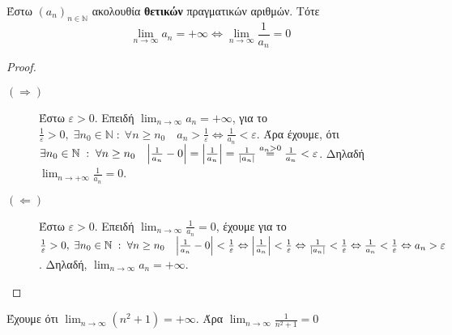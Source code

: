 \begin{mybox3}
  \begin{prop}\label{prop:infzero}
    Έστω $ (a_{n})_{n \in \mathbb{N}} $ ακολουθία \textbf{θετικών} πραγματικών αριθμών. 
    Τότε 
    \[
      \lim_{n \to \infty} a_{n}= +\infty \Leftrightarrow \lim_{n \to \infty} \frac{1}{a_{n}}
      =0  
    \] 
  \end{prop}
\end{mybox3}
\begin{proof}
\item {}
  \begin{description}
    \item[$ (\Rightarrow) $] 
      Έστω $ \varepsilon >0 $.
      Επειδή $ \lim_{n \to \infty} a_{n}= +\infty $, για το 
      $ \frac{1}{\varepsilon} >0, \; \exists n_{0} \in \mathbb{N} \; : \; 
      \forall n \geq n_{0} \quad a_{n} > \frac{1}{\varepsilon} 
      \Leftrightarrow \frac{1}{a_{n}} < \varepsilon $. 
      Άρα έχουμε, ότι $ \exists n_{0} \in \mathbb{N} \; : \; \forall n
      \geq n_{0} \quad \abs{\frac{1}{a_{n}} - 0} = \abs{\frac{1}{a_{n}}} =
      \frac{1}{\abs{a_{n}}} \overset{a_{n}>0}{=} \frac{1}{a_{n}} < \varepsilon $.
      Δηλαδή $ \lim_{n \to +\infty} \frac{1}{a_{n}} =0$.
    \item [$ (\Leftarrow) $]
      Έστω $ \varepsilon >0 $.
      Επειδή $ \lim_{n \to \infty} \frac{1}{a_{n}} = 0 $, έχουμε για το  
      $ \frac{1}{\varepsilon} > 0, \; \exists n_{0} \in \mathbb{N} \; : \; 
      \forall n \geq n_{0} \quad \abs{\frac{1}{a_{n}} -0} < \frac{1}{\varepsilon} 
      \Leftrightarrow \abs{\frac{1}{a_{n}}} < \frac{1}{\varepsilon} 
      \Leftrightarrow \frac{1}{\abs{a_{n}}} < \frac{1}{\varepsilon} 
      \Leftrightarrow \frac{1}{a_{n}} < \frac{1}{\varepsilon} 
      \Leftrightarrow a_{n} > \varepsilon $. Δηλαδή, $ \lim_{n \to \infty}
      a_{n}=+\infty $.
  \end{description}
\end{proof}


\begin{example}
  Έχουμε ότι $ \lim_{n \to \infty} (n^{2}+1) = +\infty $. Άρα 
  $ \lim_{n \to \infty} \frac{1}{n^{2}+1} = 0 $
\end{example}

